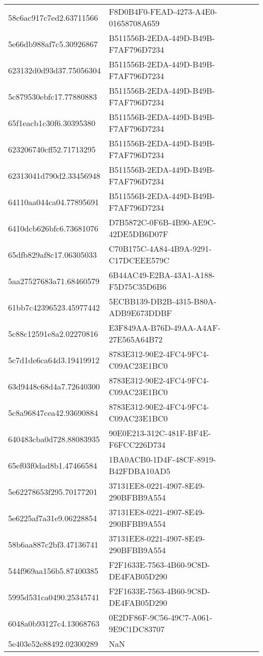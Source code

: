 \begin{tabular}{ll}
58c6ac917c7ed2.63711566 & F8D0B4F0-FEAD-4273-A4E0-01658708A659 \\
5e66db988af7c5.30926867 & B511556B-2EDA-449D-B49B-F7AF796D7234 \\
623132d0d93d37.75056304 & B511556B-2EDA-449D-B49B-F7AF796D7234 \\
5c879530ebfc17.77880883 & B511556B-2EDA-449D-B49B-F7AF796D7234 \\
65f1eacb1c30f6.30395380 & B511556B-2EDA-449D-B49B-F7AF796D7234 \\
623206740cff52.71713295 & B511556B-2EDA-449D-B49B-F7AF796D7234 \\
62313041d790d2.33456948 & B511556B-2EDA-449D-B49B-F7AF796D7234 \\
64110aa044ca04.77895691 & B511556B-2EDA-449D-B49B-F7AF796D7234 \\
6410dcb626bfc6.73681076 & D7B5872C-0F6B-4B90-AE9C-42DE5DB6D07F \\
65dfb829af8c17.06305033 & C70B175C-4A84-4B9A-9291-C17DCEEE579C \\
5aa27527683a71.68460579 & 6B44AC49-E2BA-43A1-A188-F5D75C35D6B6 \\
61bb7c42396523.45977442 & 5ECBB139-DB2B-4315-B80A-ADB9E673DDBF \\
5c88c12591e8a2.02270816 & E3F849AA-B76D-49AA-A4AF-27E565A64B72 \\
5c7d1de6ca64d3.19419912 & 8783E312-90E2-4FC4-9FC4-C09AC23E1BC0 \\
63d9448c68d4a7.72640300 & 8783E312-90E2-4FC4-9FC4-C09AC23E1BC0 \\
5c8a96847cea42.93690884 & 8783E312-90E2-4FC4-9FC4-C09AC23E1BC0 \\
640483cba0d728.88083935 & 90E0E213-312C-481F-BF4E-F6FCC226D734 \\
65ef03f0dad8b1.47466584 & 1BA0ACB0-1D4F-48CF-8919-B42FDBA10AD5 \\
5e62278653f295.70177201 & 37131EE8-0221-4907-8E49-290BFBB9A554 \\
5e6225af7a31e9.06228854 & 37131EE8-0221-4907-8E49-290BFBB9A554 \\
58b6aa887c2bf3.47136741 & 37131EE8-0221-4907-8E49-290BFBB9A554 \\
544f969aa156b5.87400385 & F2F1633E-7563-4B60-9C8D-DE4FAB05D290 \\
5995d531ca0490.25345741 & F2F1633E-7563-4B60-9C8D-DE4FAB05D290 \\
6048a0b93127c4.13068763 & 0E2DF86F-9C56-49C7-A061-9E9C1DC83707 \\
5e403e52e88492.02300289 & NaN \\

\end{tabular}
